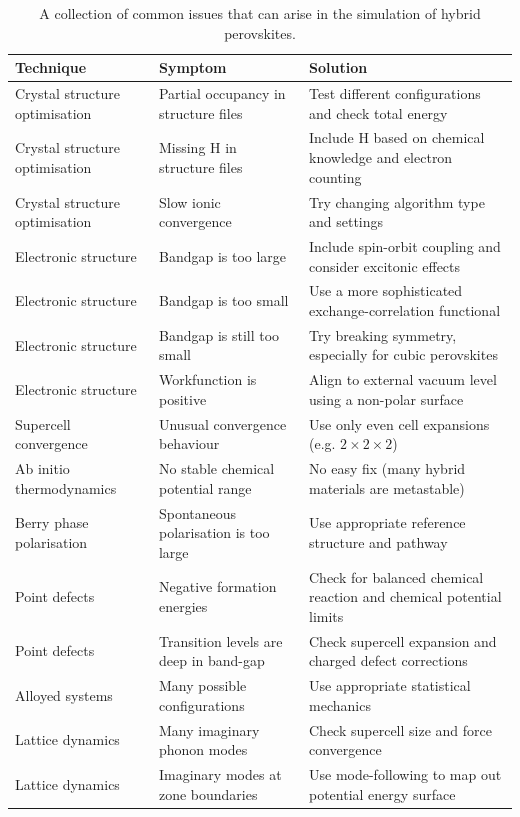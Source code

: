 \begin{table} \centering
\caption[Common issues that arise in the simulation of hybrid perovskites]{\label{tab:techsol} A collection of common issues that can arise in the simulation of hybrid perovskites.
}
\begin{tabular}{p{4cm}p{4cm}p{6cm}}
\toprule
Technique & Symptom & Solution \\
\midrule
Crystal structure optimisation & Partial occupancy in structure files & Test different configurations and check total energy \\
Crystal structure optimisation & Missing H in structure files & Include H based on chemical knowledge and electron counting  \\
Crystal structure optimisation & Slow ionic convergence & Try changing algorithm type and settings \\
Electronic structure & Bandgap is too large & Include spin-orbit coupling and consider excitonic effects \\
Electronic structure & Bandgap is too small & Use a more sophisticated exchange-correlation functional \\
Electronic structure & Bandgap is still too small & Try breaking symmetry, especially for cubic perovskites \\
Electronic structure & Workfunction is positive & Align to external vacuum level using a non-polar surface  \\
Supercell convergence & Unusual convergence behaviour & Use only even cell expansions (e.g. $2\times2\times2$) \\
Ab initio thermodynamics & No stable chemical potential range & No easy fix (many hybrid materials are metastable) \\
Berry phase polarisation & Spontaneous polarisation is too large & Use appropriate reference structure and pathway \\
Point defects & Negative formation energies & Check for balanced chemical reaction and chemical potential limits \\
Point defects & Transition levels are deep in band-gap & Check supercell expansion and charged defect corrections \\
Alloyed systems & Many possible configurations & Use appropriate statistical mechanics \\
Lattice dynamics & Many imaginary phonon modes & Check supercell size and force convergence \\
Lattice dynamics & Imaginary modes at zone boundaries & Use mode-following to map out potential energy surface \\

\end{tabular}
\end{table}

